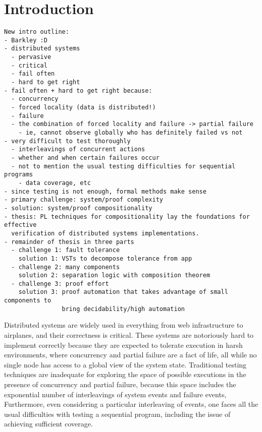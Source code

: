 \chapter{Introduction}
\label{chap:intro}

\begin{verbatim}
New intro outline:
- Barkley :D
- distributed systems
  - pervasive
  - critical
  - fail often
  - hard to get right
- fail often + hard to get right because:
  - concurrency
  - forced locality (data is distributed!)
  - failure
  - the combination of forced locality and failure -> partial failure
    - ie, cannot observe globally who has definitely failed vs not
- very difficult to test thoroughly
  - interleavings of concurrent actions
  - whether and when certain failures occur
  - not to mention the usual testing difficulties for sequential programs
    - data coverage, etc
- since testing is not enough, formal methods make sense
- primary challenge: system/proof complexity
- solution: system/proof compositionality
- thesis: PL techniques for compositionality lay the foundations for effective
  verification of distributed systems implementations.
- remainder of thesis in three parts
  - challenge 1: fault tolerance
    solution 1: VSTs to decompose tolerance from app
  - challenge 2: many components
    solution 2: separation logic with composition theorem
  - challenge 3: proof effort
    solution 3: proof automation that takes advantage of small components to
                bring decidability/high automation
\end{verbatim}

Distributed systems are widely used
  in everything from web infrastructure to airplanes,
  and their correctness is critical.
These systems are notoriously hard to implement correctly
  because they are expected to tolerate execution in harsh environments,
  where concurrency and partial failure are a fact of life,
  all while no single node has access to a global view of the system state.
Traditional testing techniques are inadequate
  for exploring the space of possible executions
  in the presence of concurrency and partial failure,
  because this space includes the exponential number of
  interleavings of system events and failure events,
Furthermore, even considering a particular interleaving of events,
  one faces all the usual difficulties with testing a sequential program,
  including the issue of achieving sufficient coverage.

